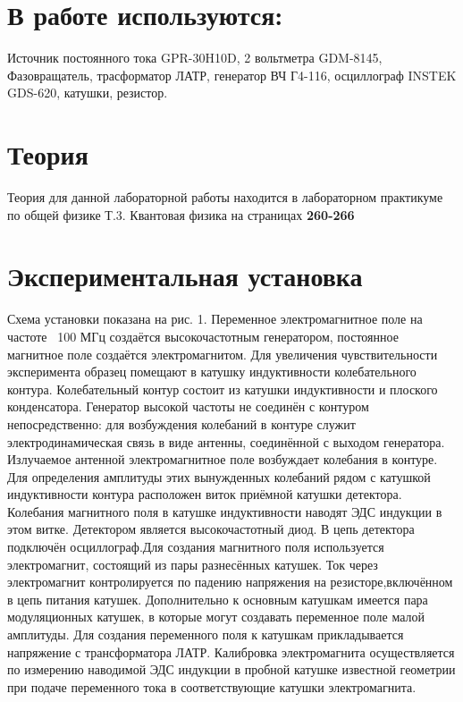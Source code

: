 \documentclass[14pt,a4paper]{scrartcl}
\begin{document}
\section{В работе используются:}
Источник постоянного тока GPR-30H10D, 2 вольтметра GDM-8145, Фазовращатель, трасформатор ЛАТР, генератор ВЧ Г4-116, осциллограф INSTEK GDS-620, катушки, резистор.

\section{Теория}

Теория для данной лабораторной работы находится в лабораторном практикуме по общей физике Т.3. Квантовая физика на страницах \textbf{260-266}


\section{Экспериментальная установка}


Схема установки показана на рис. 1. Переменное электромагнитное поле на частоте ~100 МГц создаётся высокочастотным генератором, постоянное магнитное поле создаётся электромагнитом. Для увеличения чувствительности эксперимента образец помещают в катушку индуктивности колебательного контура. Колебательный контур состоит из катушки индуктивности и плоского конденсатора. Генератор высокой частоты не соединён с контуром непосредственно: для возбуждения колебаний в контуре служит электродинамическая связь в виде антенны, соединённой с выходом генератора. Излучаемое антенной электромагнитное поле возбуждает колебания в контуре. Для определения амплитуды этих вынужденных колебаний рядом с
катушкой индуктивности контура расположен виток приёмной катушки детектора. Колебания магнитного поля в катушке индуктивности наводят ЭДС индукции в этом витке. Детектором является высокочастотный диод. В цепь детектора подключён осциллограф.Для создания магнитного поля используется электромагнит, состоящий из пары разнесённых катушек. Ток через электромагнит контролируется по падению напряжения на резисторе,включённом в цепь питания катушек. Дополнительно к основным катушкам имеется пара
модуляционных катушек, в которые могут создавать переменное поле малой амплитуды. Для
создания переменного поля к катушкам прикладывается напряжение с трансформатора ЛАТР. Калибровка электромагнита осуществляется по измерению наводимой
ЭДС индукции в пробной катушке известной геометрии при подаче переменного тока в
соответствующие катушки электромагнита.
\end{document}
